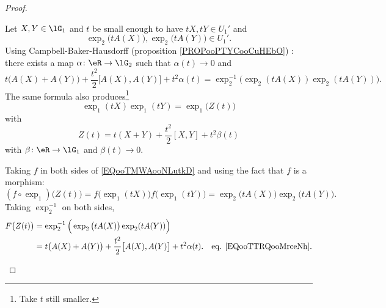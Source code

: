\begin{proof}
\begin{subproof}
		\spitem[\( A(X+Y)=A(X)+A(Y)\)]
		Let \( X,Y\in \lG_1\) and \( t\) be small enough to have \( tX,tY\in U_1'\) and
		\begin{equation}
			\exp_2\big( tA(X) \big),\exp_2\big( tA(Y) \big)\in U_1'.
		\end{equation}
		Using Campbell-Baker-Hausdorff (proposition \ref{PROPooPTYCooCuHEbO}) : there exists a map \(\alpha \colon \eR\to \lG_2  \) such that \( \alpha(t)\to 0\) and
		\begin{equation}		\label{EQooTTRQooMrceNh}
			t\big( A(X)+A(Y) \big)+\frac{ t^2 }{2}\big[  A(X),A(Y) \big]+t^2\alpha(t)=\exp_2^{-1}\Big( \exp_2(tA(X))\exp_2(tA(Y)) \Big).
		\end{equation}
		The same formula also produces\footnote{Take \( t\) still smaller.}
		\begin{equation}		\label{EQooTMWAooNLutkD}
			\exp_1(tX)\exp_1(tY)=\exp_1\big(  Z(t) \big)
		\end{equation}
		with
		\begin{equation}
			Z(t)=t(X+Y)+\frac{ t^2 }{2}[X,Y]+t^2\beta(t)
		\end{equation}
		with \(\beta \colon \eR\to \lG_1  \) and \( \beta(t)\to 0\).

		Taking \( f\) in both sides of \eqref{EQooTMWAooNLutkD} and using the fact that \( f\) is a morphism:
		\begin{equation}
			(f\circ\exp_1)\big( Z(t) \big)=f\big( \exp_1(tX) \big)f\big( \exp_1(tY) \big)=\exp_2\big( tA(X) \big)\exp_2\big( tA(Y) \big).
		\end{equation}
		Taking \( \exp_2^{-1}\) on both sides,
		\begin{subequations}
			\begin{align}
				F\big( Z(t) \big) & =\exp_2^{-1}\Big( \exp_2\big( tA(X) \big)\exp_2(tA(Y)) \Big)                                                                                      \\
				                  & =t\big( A(X)+A(Y) \big)+\frac{ t^2 }{2}\big[    A(X),A(Y) \big]+t^2\alpha(t). & \text{eq. \eqref{EQooTTRQooMrceNh}}.		\label{SUBEQooPWCCooKGpAtO}
			\end{align}
		\end{subequations}


\end{subproof}
\end{proof}
